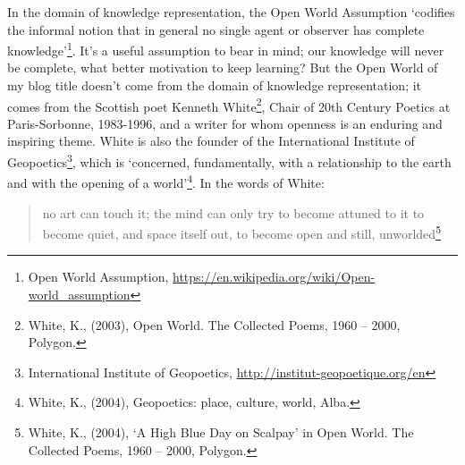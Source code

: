 In the domain of knowledge representation, the Open World Assumption
`codifies the informal notion that in general no single agent or
observer has complete knowledge'\footnote{Open World Assumption,
  \url{https://en.wikipedia.org/wiki/Open-world_assumption}}. It's a
useful assumption to bear in mind; our knowledge will never be complete,
what better motivation to keep learning? But the Open World of my blog
title doesn't come from the domain of knowledge representation; it comes
from the Scottish poet Kenneth White\footnote{White, K., (2003), Open
  World. The Collected Poems, 1960 -- 2000, Polygon.}, Chair of 20th
Century Poetics at Paris-Sorbonne, 1983-1996, and a writer for whom
openness is an enduring and inspiring theme. White is also the founder
of the International Institute of Geopoetics\footnote{International
  Institute of Geopoetics, \url{http://institut-geopoetique.org/en}},
which is `concerned, fundamentally, with a relationship to the earth and
with the opening of a world'\footnote{White, K., (2004), Geopoetics:
  place, culture, world, Alba.}. In the words of White:

\begin{quote}
no art can touch it; the mind can only try to become attuned to it to
become quiet, and space itself out, to become open and still,
unworlded\footnote{White, K., (2004), `A High Blue Day on Scalpay' in
  Open World. The Collected Poems, 1960 -- 2000, Polygon.}
\end{quote}
